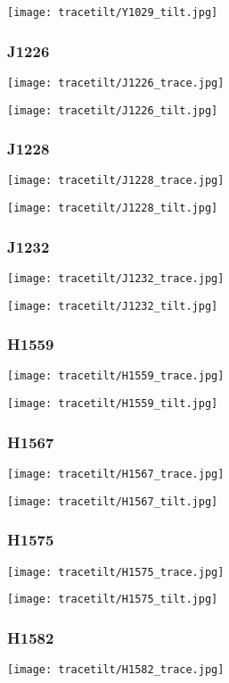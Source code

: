 \texttt{[image: tracetilt/Y1029\_tilt.jpg]}

\subsubsection{J1226}
\texttt{[image: tracetilt/J1226\_trace.jpg]}

\texttt{[image: tracetilt/J1226\_tilt.jpg]}

\subsubsection{J1228}
\texttt{[image: tracetilt/J1228\_trace.jpg]}

\texttt{[image: tracetilt/J1228\_tilt.jpg]}

\subsubsection{J1232}
\texttt{[image: tracetilt/J1232\_trace.jpg]}

\texttt{[image: tracetilt/J1232\_tilt.jpg]}

\subsubsection{H1559}
\texttt{[image: tracetilt/H1559\_trace.jpg]}

\texttt{[image: tracetilt/H1559\_tilt.jpg]}

\subsubsection{H1567}
\texttt{[image: tracetilt/H1567\_trace.jpg]}

\texttt{[image: tracetilt/H1567\_tilt.jpg]}

\subsubsection{H1575}
\texttt{[image: tracetilt/H1575\_trace.jpg]}

\texttt{[image: tracetilt/H1575\_tilt.jpg]}

\subsubsection{H1582}
\texttt{[image: tracetilt/H1582\_trace.jpg]}

